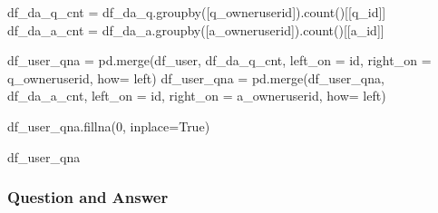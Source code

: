 \documentclass[
  letterpaper,
  DIV=11,
  numbers=noendperiod]{scrartcl}
\newenvironment{Shaded}{\begin{snugshade}}{\end{snugshade}}
\newcommand{\DecValTok}[1]{\textcolor[rgb]{0.68,0.00,0.00}{#1}}
\newcommand{\NormalTok}[1]{\textcolor[rgb]{0.00,0.23,0.31}{#1}}
\newcommand{\OperatorTok}[1]{\textcolor[rgb]{0.37,0.37,0.37}{#1}}
\newcommand{\StringTok}[1]{\textcolor[rgb]{0.13,0.47,0.30}{#1}}
\newcommand{\VariableTok}[1]{\textcolor[rgb]{0.07,0.07,0.07}{#1}}
\begin{document}
\begin{Shaded}
\begin{Highlighting}[]
\NormalTok{df\_da\_q\_cnt }\OperatorTok{=}\NormalTok{ df\_da\_q.groupby([}\StringTok{\textquotesingle{}q\_owneruserid\textquotesingle{}}\NormalTok{]).count()[[}\StringTok{\textquotesingle{}q\_id\textquotesingle{}}\NormalTok{]]}
\NormalTok{df\_da\_a\_cnt }\OperatorTok{=}\NormalTok{ df\_da\_a.groupby([}\StringTok{\textquotesingle{}a\_owneruserid\textquotesingle{}}\NormalTok{]).count()[[}\StringTok{\textquotesingle{}a\_id\textquotesingle{}}\NormalTok{]]}
\end{Highlighting}
\end{Shaded}

\begin{Shaded}
\begin{Highlighting}[]
\NormalTok{df\_user\_qna }\OperatorTok{=}\NormalTok{ pd.merge(df\_user, df\_da\_q\_cnt, left\_on }\OperatorTok{=} \StringTok{\textquotesingle{}id\textquotesingle{}}\NormalTok{, right\_on }\OperatorTok{=} \StringTok{\textquotesingle{}q\_owneruserid\textquotesingle{}}\NormalTok{, how}\OperatorTok{=} \StringTok{\textquotesingle{}left\textquotesingle{}}\NormalTok{)}
\NormalTok{df\_user\_qna }\OperatorTok{=}\NormalTok{ pd.merge(df\_user\_qna, df\_da\_a\_cnt, left\_on }\OperatorTok{=} \StringTok{\textquotesingle{}id\textquotesingle{}}\NormalTok{, right\_on }\OperatorTok{=} \StringTok{\textquotesingle{}a\_owneruserid\textquotesingle{}}\NormalTok{, how}\OperatorTok{=} \StringTok{\textquotesingle{}left\textquotesingle{}}\NormalTok{)}
\end{Highlighting}
\end{Shaded}

\begin{Shaded}
\begin{Highlighting}[]
\NormalTok{df\_user\_qna.fillna(}\DecValTok{0}\NormalTok{, inplace}\OperatorTok{=}\VariableTok{True}\NormalTok{)}
\end{Highlighting}
\end{Shaded}

\begin{Shaded}
\begin{Highlighting}[]
\NormalTok{df\_user\_qna}
\end{Highlighting}
\end{Shaded}

\subsubsection{Question and Answer}\label{question-and-answer}
\end{document}
